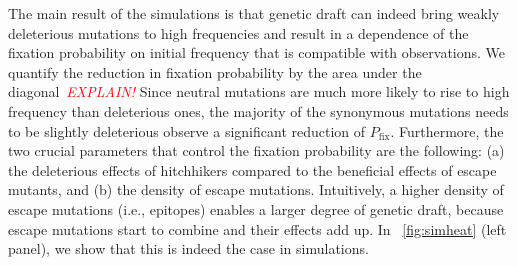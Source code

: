 \documentclass[rmp, twocolumn]{revtex4}
\newcommand{\comment}[1]{\textit{\textcolor{red}{#1}}}
\begin{document}
The main result of the simulations is that genetic draft can indeed bring weakly
deleterious mutations to high frequencies and result in a dependence of the
fixation probability on initial frequency that is compatible with observations.
We quantify the reduction in fixation probability by the area under the
diagonal~\comment{EXPLAIN!} Since neutral mutations are much more likely to rise
to high frequency than deleterious ones, the majority of the synonymous
mutations needs to be slightly deleterious observe a significant reduction of
$P_\text{fix}$. Furthermore, the two crucial parameters that control the fixation probability
are the following: (a) the deleterious effects of hitchhikers compared to
the beneficial effects of escape mutants, and (b) the density of escape
mutations. Intuitively, a higher density of escape mutations (i.e., epitopes)
enables a larger degree of genetic draft, because escape mutations start to
combine and their effects add up. In \figurename~\ref{fig:simheat} (left panel),
we show that this is indeed the case in simulations.
\end{document}
